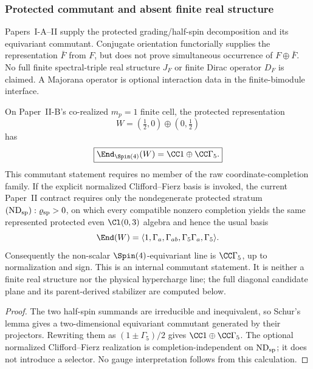 \documentclass[12pt,a4paper]{article}
\begin{document}
\subsubsection{Protected commutant and absent finite real structure}
\label{p5:sec:part1-native-JGamma}

Papers~I-A--II supply the protected grading/half-spin decomposition and its
equivariant commutant.  Conjugate orientation functorially supplies the
representation \(\bar F\) from \(F\), but does not prove simultaneous
occurrence of \(F\oplus\bar F\).  No full finite spectral-triple real
structure \(J_F\) or finite Dirac operator \(D_F\) is claimed.  A Majorana
operator is optional interaction data in the finite-bimodule interface.


\begin{corollary}
\label{p5:cor:protected-fierz-abelian-line}
On Paper~II-B's co-realized \(m_p=1\) finite cell, the protected representation
\[
W=\left(\tfrac12,0\right)\oplus\left(0,\tfrac12\right)
\]
has
\[
\boxed{\End_{\Spin(4)}(W)=\CC 1\oplus \CC\Gamma_5.}
\]
This commutant statement requires no member of the raw coordinate-completion
family.  If the explicit normalized Clifford--Fierz basis is invoked, the
current Paper~II contract requires only the nondegenerate protected stratum
\((\mathrm{ND}_{\rm sp}):\varrho_{\rm sp}>0\), on which every compatible
nonzero completion yields the same represented protected even
\(\Cl(0,3)\) algebra and hence the usual basis
\[
\End(W)
=
\langle
1,\Gamma_a,\Gamma_{ab},\Gamma_5\Gamma_a,\Gamma_5
\rangle.
\]
Consequently the non-scalar \(\Spin(4)\)-equivariant line is
\(\CC\Gamma_5\), up to normalization and sign.  This is an internal commutant
statement.  It is neither a finite real structure nor the physical
hypercharge line; the full diagonal candidate plane and its parent-derived
stabilizer are computed below.
\end{corollary}

\begin{proof}
The two half-spin summands are irreducible and inequivalent, so Schur's lemma
gives a two-dimensional equivariant commutant generated by their projectors.
Rewriting them as \((1\pm\Gamma_5)/2\) gives
\(\CC1\oplus\CC\Gamma_5\).  The optional normalized Clifford--Fierz
realization is completion-independent on \(\mathrm{ND}_{\rm sp}\); it does
not introduce a selector.  No gauge interpretation follows from this
calculation.
\end{proof}
\end{document}

